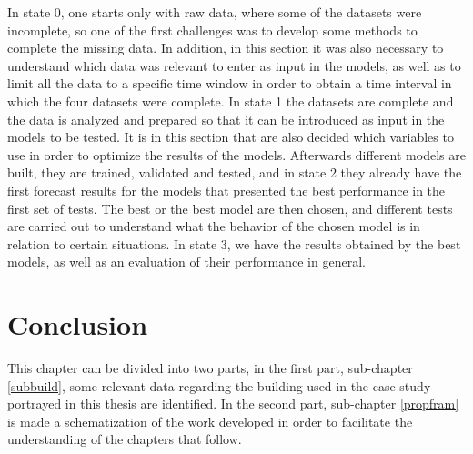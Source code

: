 In state 0, one starts only with raw data, where some of the datasets were incomplete, so one of the first challenges was to develop some methods to complete the missing data. In addition, in this section it was also necessary to understand which data was relevant to enter as input in the models, as well as to limit all the data to a specific time window in order to obtain a time interval in which the four datasets were complete. In state 1 the datasets are complete and the data is analyzed and prepared so that it can be introduced as input in the models to be tested. It is in this section that are also decided which variables to use in order to optimize the results of the models. Afterwards different models are built, they are trained, validated and tested, and in state 2 they already have the first forecast results for the models that presented the best performance in the first set of tests. The best or the best model are then chosen, and different tests are carried out to understand what the behavior of the chosen model is in relation to certain situations. In state 3, we have the results obtained by the best models, as well as an evaluation of their performance in general.

\section{Conclusion}

This chapter can be divided into two parts, in the first part, sub-chapter \ref{subbuild}, some relevant data regarding the building used in the case study portrayed in this thesis are identified. In the second part, sub-chapter \ref{propfram} is made a schematization of the work developed in order to facilitate the understanding of the chapters that follow.